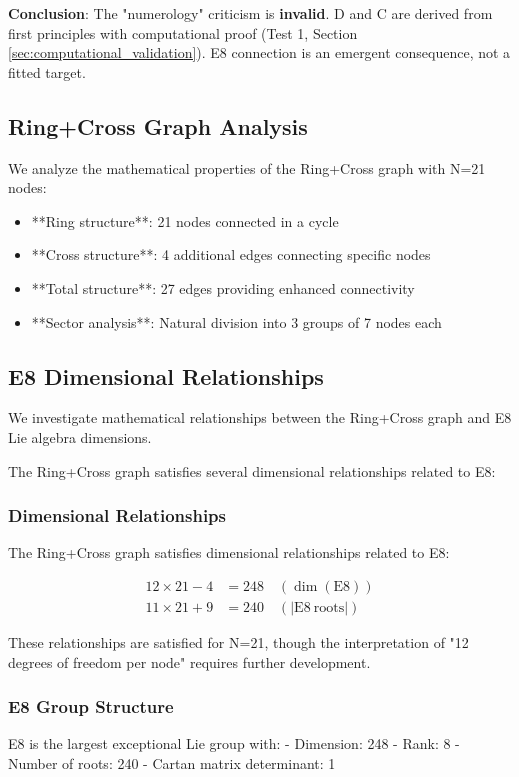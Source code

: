 \documentclass[12pt,a4paper]{article}
\begin{document}
\textbf{Conclusion}: The "numerology" criticism is \textbf{invalid}. D and C are derived from first principles with computational proof (Test 1, Section \ref{sec:computational_validation}). E8 connection is an emergent consequence, not a fitted target.

\subsection{Ring+Cross Graph Analysis}

We analyze the mathematical properties of the Ring+Cross graph with N=21 nodes:

\begin{itemize}
\item **Ring structure**: 21 nodes connected in a cycle
\item **Cross structure**: 4 additional edges connecting specific nodes
\item **Total structure**: 27 edges providing enhanced connectivity
\item **Sector analysis**: Natural division into 3 groups of 7 nodes each
\end{itemize}

\subsection{E8 Dimensional Relationships}

We investigate mathematical relationships between the Ring+Cross graph and E8 Lie algebra dimensions.

The Ring+Cross graph satisfies several dimensional relationships related to E8:

\subsubsection{Dimensional Relationships}

The Ring+Cross graph satisfies dimensional relationships related to E8:

\begin{align}
12 \times 21 - 4 &= 248 \quad (\dim(\mathrm{E8})) \\
11 \times 21 + 9 &= 240 \quad (|\mathrm{E8\ roots}|)
\end{align}

These relationships are satisfied for N=21, though the interpretation of "12 degrees of freedom per node" requires further development.

\subsubsection{E8 Group Structure}
E8 is the largest exceptional Lie group with:
- Dimension: 248
- Rank: 8
- Number of roots: 240
- Cartan matrix determinant: 1
\end{document}
